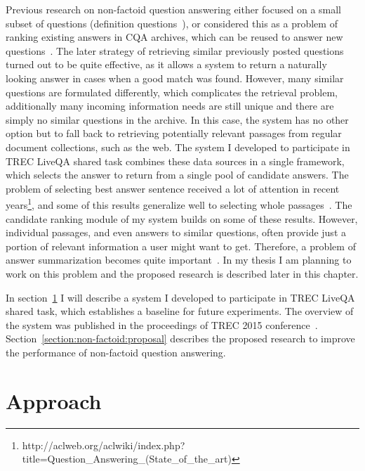 Previous research on non-factoid question answering either focused on a small subset of questions (\eg definition questions~\cite{hildebrandt2004answering}), or considered this as a problem of ranking existing answers in CQA archives, which can be reused to answer new questions~\cite{carmel2000eresponder,Shtok:2012:LPA:2187836.2187939}.
The later strategy of retrieving similar previously posted questions turned out to be quite effective, as it allows a system to return a naturally looking answer in cases when a good match was found.
However, many similar questions are formulated differently, which complicates the retrieval problem, additionally many incoming information needs are still unique and there are simply no similar questions in the archive.
In this case, the system has no other option but to fall back to retrieving potentially relevant passages from regular document collections, such as the web.
The system I developed to participate in TREC LiveQA shared task combines these data sources in a single framework, which selects the answer to return from a single pool of candidate answers.
The problem of selecting best answer sentence received a lot of attention in recent years\footnote{http://aclweb.org/aclwiki/index.php?title=Question\_Answering\_(State\_of\_the\_art)}, and some of this results generalize well to selecting whole passages~\cite{diwang_lstm_2015}.
The candidate ranking module of my system builds on some of these results.
However, individual passages, and even answers to similar questions, often provide just a portion of relevant information a user might want to get.
Therefore, a problem of answer summarization becomes quite important~\cite{liu2008understanding,pande2013summarizing,tomasoni2010metadata}.
In my thesis I am planning to work on this problem and the proposed research is described later in this chapter.

In section~\ref{section:non-factoid:approach} I will describe a system I developed to participate in TREC LiveQA shared task, which establishes a baseline for future experiments.
The overview of the system was published in the proceedings of TREC 2015 conference~\cite{savenkov_liveqa15}.
Section~\ref{section:non-factoid:proposal} describes the proposed research to improve the performance of non-factoid question answering.

\section{Approach}
\label{section:non-factoid:approach}

